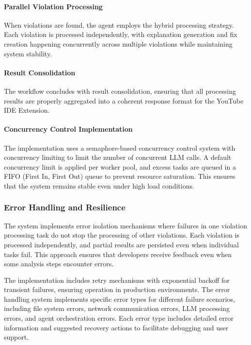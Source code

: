 \begin{spacing}{1.2}
\paragraph{Parallel Violation Processing}
When violations are found, the agent employs the hybrid processing strategy. Each violation is processed independently, with explanation generation and fix creation happening concurrently across multiple violations while maintaining system stability.

\paragraph{Result Consolidation}
The workflow concludes with result consolidation, ensuring that all processing results are properly aggregated into a coherent response format for the YouTube IDE Extension.

\paragraph{Concurrency Control Implementation}
The implementation uses a semaphore-based concurrency control system with concurrency limiting to limit the number of concurrent LLM calls. A default concurrency limit is applied per worker pool, and excess tasks are queued in a FIFO (First In, First Out) queue to prevent resource saturation. This ensures that the system remains stable even under high load conditions.

\subsubsection{Error Handling and Resilience}
The system implements error isolation mechanisms where failures in one violation processing task do not stop the processing of other violations. Each violation is processed independently, and partial results are persisted even when individual tasks fail. This approach ensures that developers receive feedback even when some analysis steps encounter errors.

The implementation includes retry mechanisms with exponential backoff for transient failures, ensuring operation in production environments. The error handling system implements specific error types for different failure scenarios, including file system errors, network communication errors, LLM processing errors, and agent orchestration errors. Each error type includes detailed error information and suggested recovery actions to facilitate debugging and user support.


\end{spacing}
